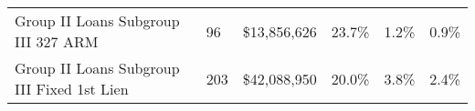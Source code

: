 \begin{tabular}{llllll}
Group II Loans Subgroup III 327 ARM        &                           96 &                    \$13,856,626 &                              23.7\% &                          1.2\% &                                               0.9\% \\
Group II Loans Subgroup III Fixed 1st Lien &                          203 &                    \$42,088,950 &                              20.0\% &                          3.8\% &                                               2.4\% \\
\bottomrule
\end{tabular}
